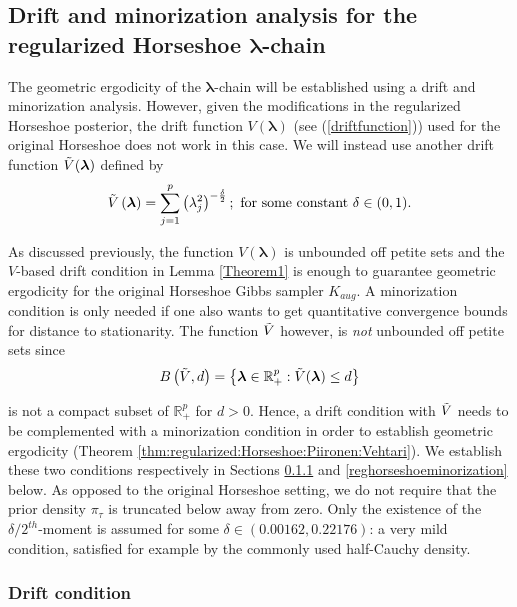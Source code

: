 \documentclass[noinfoline,11pt]{imsart}
\numberwithin{equation}{section}
\theoremstyle{plain}
\newcommand{\bl}{\boldsymbol{\lambda}}
\begin{document}
\subsection{Drift and minorization analysis for the regularized Horseshoe 
$\bl$-chain} \label{Regularized:drift:minorization}

\noindent
The geometric ergodicity of the $\bl$-chain will be established using a 
drift and minorization analysis. However, given the modifications in the 
regularized Horseshoe posterior, the drift function $V(\bl)$ (see 
(\ref{driftfunction})) used for the original Horseshoe does not work in 
this case. We will instead use another drift function $\Tilde{V}(\bl)$ 
defined by 
\begin{equation}\label{driftfunctionreghorseshoe}
    \Tilde{V}\left(\mathbf{\bl}\right)=\sum\limits_{j=1}^p\left(\lambda_j^2\right)^{-\frac{\delta}{2}};\ \text{for some constant}\ \delta\in(0,1).
    \end{equation}

\noindent
As discussed previously, the function $V(\bl)$ is unbounded off petite sets and the $V$-based drift condition in Lemma \ref{Theorem1} is enough to guarantee geometric ergodicity for the original Horseshoe Gibbs sampler 
$K_{aug}$. A minorization condition is only needed if one also wants to get quantitative convergence bounds for distance to stationarity. The function 
$\Tilde{V}$ however, is {\it not} unbounded off petite sets since 
$$
B \left(\Tilde{V}, d \right) = \left\{ \bl \in \mathbb{R}_+^p: 
\Tilde{V}(\bl) \leq d \right\}
$$

\noindent
is not a compact subset of $\mathbb{R}_+^p$ for $d > 0$. Hence, a drift 
condition with $\Tilde{V}$ needs to be complemented with a minorization condition in order to establish geometric ergodicity (Theorem \ref{thm:regularized:Horseshoe:Piironen:Vehtari}). We establish these 
two conditions respectively in Sections \ref{driftreghorseshoe} and \ref{reghorseshoeminorization} below. As opposed to the original Horseshoe setting, 
we do not require that the prior density $\pi_\tau$ is truncated below away from zero. Only the existence of the $\delta/2^{th}$-moment is assumed for some 
$\delta \in (0.00162, 0.22176)$: a very mild condition, satisfied for example by the commonly used half-Cauchy density. 

\subsubsection{Drift condition}\label{driftreghorseshoe}
\end{document}

